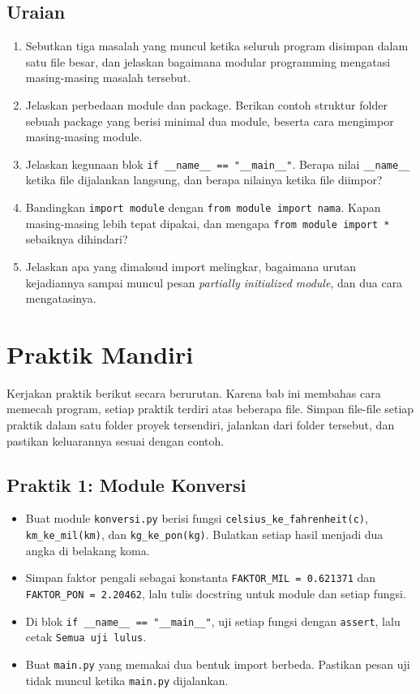 \subsection{Uraian}

\begin{enumerate}
  \item Sebutkan tiga masalah yang muncul ketika seluruh program disimpan dalam satu file besar, dan jelaskan bagaimana modular programming mengatasi masing-masing masalah tersebut.
  \item Jelaskan perbedaan module dan package. Berikan contoh struktur folder sebuah package yang berisi minimal dua module, beserta cara mengimpor masing-masing module.
  \item Jelaskan kegunaan blok \texttt{if \_\_name\_\_ == "\_\_main\_\_"}. Berapa nilai \texttt{\_\_name\_\_} ketika file dijalankan langsung, dan berapa nilainya ketika file diimpor?
  \item Bandingkan \texttt{import module} dengan \texttt{from module import nama}. Kapan masing-masing lebih tepat dipakai, dan mengapa \texttt{from module import *} sebaiknya dihindari?
  \item Jelaskan apa yang dimaksud import melingkar, bagaimana urutan kejadiannya sampai muncul pesan \emph{partially initialized module}, dan dua cara mengatasinya.
\end{enumerate}

\section{Praktik Mandiri}

Kerjakan praktik berikut secara berurutan. Karena bab ini membahas cara memecah program, setiap praktik terdiri atas beberapa file. Simpan file-file setiap praktik dalam satu folder proyek tersendiri, jalankan dari folder tersebut, dan pastikan keluarannya sesuai dengan contoh.

\subsection{Praktik 1: Module Konversi}

\begin{itemize}
  \item Buat module \texttt{konversi.py} berisi fungsi \texttt{celsius\_ke\_fahrenheit(c)}, \texttt{km\_ke\_mil(km)}, dan \texttt{kg\_ke\_pon(kg)}. Bulatkan setiap hasil menjadi dua angka di belakang koma.
  \item Simpan faktor pengali sebagai konstanta \texttt{FAKTOR\_MIL = 0.621371} dan \texttt{FAKTOR\_PON = 2.20462}, lalu tulis docstring untuk module dan setiap fungsi.
  \item Di blok \texttt{if \_\_name\_\_ == "\_\_main\_\_"}, uji setiap fungsi dengan \texttt{assert}, lalu cetak \texttt{Semua uji lulus}.
  \item Buat \texttt{main.py} yang memakai dua bentuk import berbeda. Pastikan pesan uji tidak muncul ketika \texttt{main.py} dijalankan.
\end{itemize}

